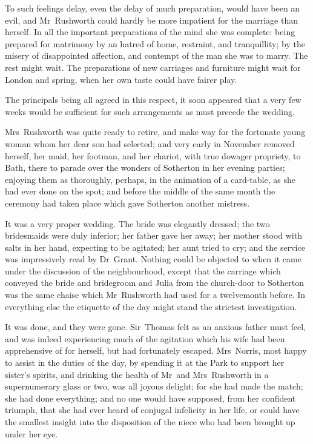 To such feelings delay, even the delay of much preparation, would have been an evil, and Mr~Rushworth could hardly be more impatient for the marriage than herself. In all the important preparations of the mind she was complete: being prepared for matrimony by an hatred of home, restraint, and tranquillity; by the misery of disappointed affection, and contempt of the man she was to marry. The rest might wait. The preparations of new carriages and furniture might wait for London and spring, when her own taste could have fairer play.

The principals being all agreed in this respect, it soon appeared that a very few weeks would be sufficient for such arrangements as must precede the wedding.

Mrs~Rushworth was quite ready to retire, and make way for the fortunate young woman whom her dear son had selected; and very early in November removed herself, her maid, her footman, and her chariot, with true dowager propriety, to Bath, there to parade over the wonders of Sotherton in her evening parties; enjoying them as thoroughly, perhaps, in the animation of a card-table, as she had ever done on the spot; and before the middle of the same month the ceremony had taken place which gave Sotherton another mistress.

It was a very proper wedding. The bride was elegantly dressed; the two bridesmaids were duly inferior; her father gave her away; her mother stood with salts in her hand, expecting to be agitated; her aunt tried to cry; and the service was impressively read by Dr~Grant. Nothing could be objected to when it came under the discussion of the neighbourhood, except that the carriage which conveyed the bride and bridegroom and Julia from the church-door to Sotherton was the same chaise which Mr~Rushworth had used for a twelvemonth before. In everything else the etiquette of the day might stand the strictest investigation.

It was done, and they were gone. Sir~Thomas felt as an anxious father must feel, and was indeed experiencing much of the agitation which his wife had been apprehensive of for herself, but had fortunately escaped. Mrs~Norris, most happy to assist in the duties of the day, by spending it at the Park to support her sister's spirits, and drinking the health of Mr~and Mrs~Rushworth in a supernumerary glass or two, was all joyous delight; for she had made the match; she had done everything; and no one would have supposed, from her confident triumph, that she had ever heard of conjugal infelicity in her life, or could have the smallest insight into the disposition of the niece who had been brought up under her eye.

